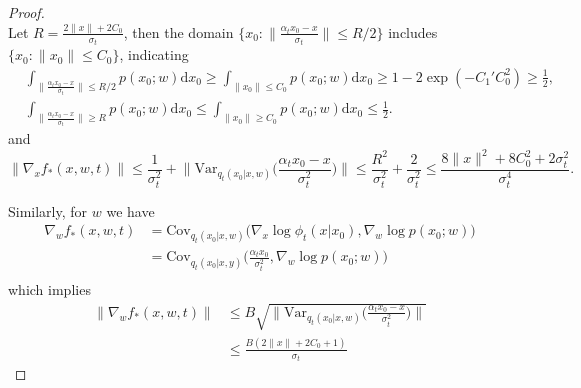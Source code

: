 \documentclass{article}
\numberwithin{equation}{section}
\newcommand{\Var}{\mathrm{Var}}
\newcommand{\Cov}{\mathrm{Cov}}
\newcommand{\dif}{\mathrm{d}}
\theoremstyle{definition}
\begin{document}
\begin{proof}
\begin{equation}
    \end{equation}
    Let $R=\frac{2\|x\|+2C_0}{\sigma_t}$, then the domain $\Big\{x_0:\|\frac{\alpha_tx_0-x}{\sigma_t}\|\leq R/2\Big\}$ includes $\Big\{x_0:\|x_0\|\leq C_0\Big\}$, indicating
    \begin{equation}
        \begin{aligned}
            &\int_{\|\frac{\alpha_tx_0-x}{\sigma_t}\|\leq R/2} p(x_0;w)\dif x_0\geq  \int_{\|x_0\|\leq C_0} p(x_0;w)\dif x_0 \geq 1-2\exp(-C_1'C_0^2)\geq \frac{1}{2},\\
            &\int_{\|\frac{\alpha_tx_0-x}{\sigma_t}\|\geq R} p(x_0;w)\dif x_0\leq  \int_{\|x_0\|\geq C_0} p(x_0;w)\dif x_0 \leq \frac{1}{2}.
        \end{aligned}
    \end{equation}
    and
    \begin{equation}\label{eq:lip_x_large}
        \|\nabla_xf_*(x,w,t)\|\leq \frac{1}{\sigma_t^2}+\big\|\Var_{q_t(x_0|x,w)}\Big(\frac{\alpha_tx_0-x}{\sigma_t^2}\Big)\big\|
        \leq \frac{R^2}{\sigma_t^2} + \frac{2}{\sigma_t^2} \leq \frac{8\|x\|^2+8C_0^2+2\sigma_t^2}{\sigma_t^4}.
    \end{equation}
    
    Similarly, for $w$ we have
    \begin{equation}
        \begin{aligned}
            \nabla_wf_*(x,w,t)
            &=\Cov_{q_t(x_0|x,w)}\big(\nabla_x\log\phi_t(x|x_0),\nabla_w\log p(x_0;w)\big) \\
            &=\Cov_{q_t(x_0|x,y)}\big(\frac{\alpha_tx_0}{\sigma_t^2},\nabla_w\log p(x_0;w)\big) \\
        \end{aligned}
    \end{equation}
    which implies 
    \begin{equation}\label{eq:lip_w_large}
        \begin{aligned}
            \|\nabla_wf_*(x,w,t)\|
            &\leq B\sqrt{\big\|\Var_{q_t(x_0|x,w)}\Big(\frac{\alpha_tx_0-x}{\sigma_t^2}\Big)\big\|} \\
            &\leq \frac{B(2\|x\|+2C_0+1)}{\sigma_t}
        \end{aligned}
    \end{equation}


\end{proof}
\end{document}
